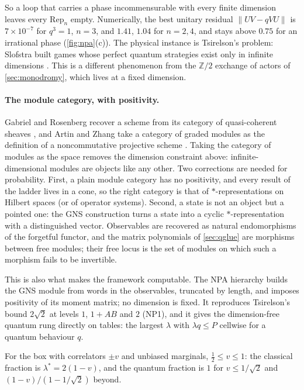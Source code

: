 \documentclass[11pt]{article}
\theoremstyle{definition}\newtheorem{definition}[theorem]{Definition}\newtheorem{remark}[theorem]{Remark}\newtheorem{example}[theorem]{Example}
\begin{document}
So a loop that carries a phase incommensurable with every finite dimension leaves every $\mathrm{Rep}_n$ empty. Numerically, the best unitary
residual $\|UV-qVU\|$ is $7\times10^{-7}$ for $q^3=1$, $n=3$, and $1.41$, $1.04$ for $n=2,4$, and stays above $0.75$ for an irrational phase
(\cref{fig:npa}(c)). The physical instance is Tsirelson's problem: Slofstra built games whose perfect quantum strategies exist only in
infinite dimensions \cite{Slofstra2020}. This is a different phenomenon from the $\mathbb Z/2$ exchange of actors of \cref{sec:monodromy},
which lives at a fixed dimension.

\paragraph{The module category, with positivity.}
Gabriel and Rosenberg recover a scheme from its category of quasi-coherent sheaves \cite{Gabriel1962,Rosenberg1998}, and Artin and Zhang take
a category of graded modules as the definition of a noncommutative projective scheme \cite{ArtinZhang1994}. Taking the category of modules as
the space removes the dimension constraint above: infinite-dimensional modules are objects like any other. Two corrections are needed for
probability. First, a plain module category has no positivity, and every result of the ladder lives in a cone, so the right category is that
of $*$-representations on Hilbert spaces (or of operator systems). Second, a state is not an object but a pointed one: the GNS construction
turns a state into a cyclic $*$-representation with a distinguished vector. Observables are recovered as natural endomorphisms of the
forgetful functor, and the matrix polynomials of \cref{sec:qglue} are morphisms between free modules; their free locus is the set of modules
on which such a morphism fails to be invertible.

This is also what makes the framework computable. The NPA hierarchy \cite{NPA2007,NPA2008} builds the GNS module from words in the
observables, truncated by length, and imposes positivity of its moment matrix; no dimension is fixed. It reproduces Tsirelson's bound
$2\sqrt2$ at levels $1$, $1{+}AB$ and $2$ (NP1), and it gives the dimension-free quantum rung directly on tables: the largest $\lambda$ with
$\lambda q\le P$ cellwise for a quantum behaviour $q$.

\begin{proposition}\label{prop:iso}
For the box with correlators $\pm v$ and unbiased marginals, $\tfrac12\le v\le1$: the classical fraction is $\lambda^*=2(1-v)$, and the quantum
fraction is $1$ for $v\le1/\sqrt2$ and $(1-v)/(1-1/\sqrt2)$ beyond.
\end{proposition}
\end{document}

